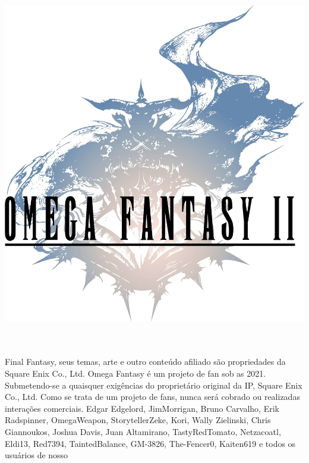 \documentclass[a4paper, titlepage, 11pt, twocolumn]{article}
\begin{document}
{
\begin{titlepage}
	\begin{center}
	\includegraphics[width=0.92\columnwidth]{./art/images/title.jpg}
	\vspace*{-1cm}\\
	\parbox{0.9\columnwidth}{\tableofcontents}
	\vspace*{\fill}\\
	\large{}\vspace*{0.3cm}\\
	\tiny
	Final Fantasy, seus temas, arte e outro conteúdo afiliado são propriedades da Square Enix Co., Ltd. 
	Omega Fantasy é um projeto de fan sob as \href{https://creativecommons.org/licenses/by-nc-sa/4.0/}{} 2021. 
	Submetendo-se a quaisquer exigências do proprietário original da IP, Square Enix Co., Ltd. Como se trata de um projeto de fans, nunca será cobrado ou realizadas interações comerciais. 
	 Edgar Edgelord, JimMorrigan, Bruno Carvalho, Erik Radspinner, OmegaWeapon, StorytellerZeke, Kori, Wally Zielinski, Chris Giannoukos, Joshua Davis, Juan Altamirano, TastyRedTomato, Netzacoatl, Eldi13, Red7394, TaintedBalance, GM-3826, The-Fencer0, Kaiten619 e todos os usuários de nosso \href{https://discordapp.com/invite/F5fpxMs}{}
	\end{center}
\end{titlepage}
%
}
%
\clearpage
{}
%





















%
\end{document}
